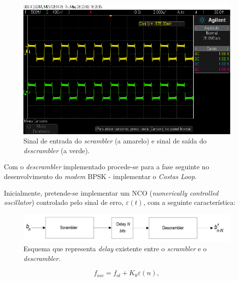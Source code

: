 \documentclass[11pt]{article}
\numberwithin{equation}{section}
\begin{document}
\begin{figure}[H]
	\centering
	\includegraphics[keepaspectratio=true, scale=0.37]{exps/DescramblerBnVsBnlinha}
	\caption{Sinal de entrada do \textit{scrambler} (a amarelo) e sinal de saída do \textit{descrambler} (a verde).}
	\vspace{-0.8em}
\end{figure}

Com o \textit{descrambler} implementado procede-se para a fase seguinte no desenvolvimento do \textit{modem} BPSK - implementar o \textit{Costas Loop}. 

Inicialmente, pretende-se implementar um NCO (\textit{numerically controlled oscillator}) controlado pelo sinal de erro, $\varepsilon (t)$, com a seguinte característica:
\begin{figure}[H]
	\centering
	\includegraphics[keepaspectratio=true, scale=0.30]{teoricas/Ndelay}
	\caption{Esquema que representa \textit{delay} existente entre o \textit{scrambler} e o \textit{descrambler}.}
	\vspace{-0.8em}
\end{figure}

\vspace{-3mm}
\begin{equation}
	f_{osc} = f_{ol} + K_0\varepsilon (n), 
\end{equation} 
\end{document}

